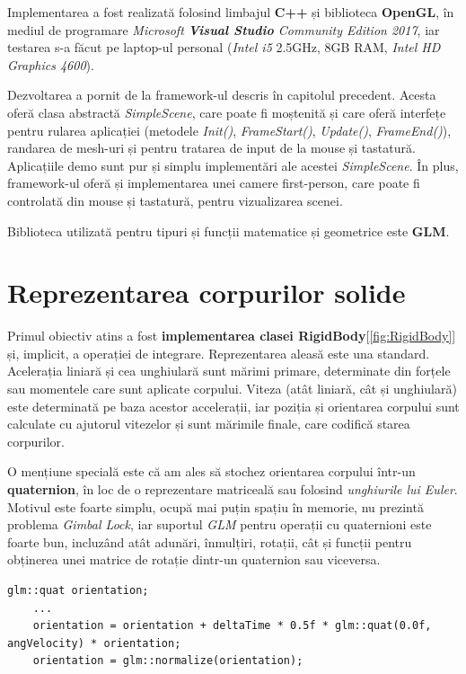 \documentclass[12pt,a4paper]{report}
\begin{document}
Implementarea a fost realizată folosind limbajul \textbf{C++} și biblioteca \textbf{OpenGL}, în mediul de programare \textit{Microsoft \textbf{Visual Studio} Community Edition 2017}, iar testarea s-a făcut pe laptop-ul personal (\textit{Intel i5} 2.5GHz, 8GB RAM, \textit{Intel HD Graphics 4600}).

Dezvoltarea a pornit de la framework-ul descris în capitolul precedent. Acesta oferă clasa abstractă \textit{SimpleScene}, care poate fi moștenită și care oferă interfețe pentru rularea aplicației (metodele \textit{Init()}, \textit{FrameStart()}, \textit{Update()}, \textit{FrameEnd()}), randarea de mesh-uri și pentru tratarea de input de la mouse și tastatură. Aplicațiile demo sunt pur și simplu implementări ale acestei \textit{SimpleScene}. În plus, framework-ul oferă și implementarea unei camere first-person, care poate fi controlată din mouse și tastatură, pentru vizualizarea scenei.

Biblioteca utilizată pentru tipuri și funcții matematice și geometrice este \textbf{GLM}\cite{glm}.

\section{Reprezentarea corpurilor solide}

Primul obiectiv atins a fost \textbf{implementarea clasei RigidBody}[\autoref{fig:RigidBody}] și, implicit, a operației de integrare. Reprezentarea aleasă este una standard. Acelerația liniară și cea unghiulară sunt mărimi primare, determinate din forțele sau momentele care sunt aplicate corpului. Viteza (atât liniară, cât și unghiulară) este determinată pe baza acestor accelerații, iar poziția și orientarea corpului sunt calculate cu ajutorul vitezelor și sunt mărimile finale, care codifică starea corpurilor.

O mențiune specială este că am ales să stochez orientarea corpului într-un \textbf{quaternion}, în loc de o reprezentare matriceală sau folosind \textit{unghiurile lui Euler}. Motivul este foarte simplu, ocupă mai puțin spațiu în memorie, nu prezintă problema \textit{Gimbal Lock}\cite{quaternions}, iar suportul \textit{GLM} pentru operații cu quaternioni este foarte bun, incluzând atât adunări, înmulțiri, rotații, cât și funcții pentru obținerea unei matrice de rotație dintr-un quaternion sau viceversa.
\begin{lstlisting}[style=myC++, label = {code:quaternion_example}, caption={actualizarea orientării în pasul de integrare}]
	glm::quat orientation;
	...
	orientation = orientation + deltaTime * 0.5f * glm::quat(0.0f, angVelocity) * orientation;
	orientation = glm::normalize(orientation);
\end{lstlisting}
\end{document}

